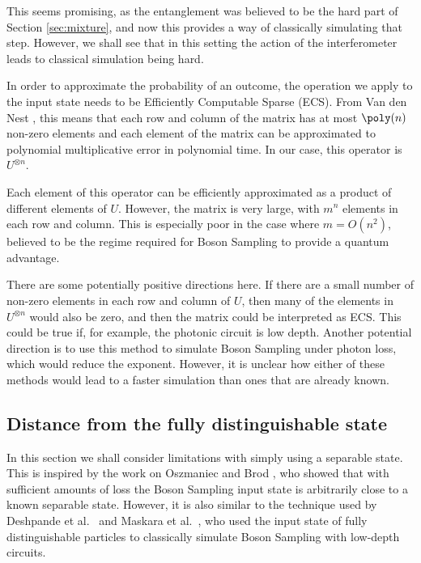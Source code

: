 This seems promising, as the entanglement was believed to be the hard part of Section \ref{sec:mixture}, and now this provides a way of classically simulating that step. However, we shall see that in this setting the action of the interferometer leads to classical simulation being hard.

In order to approximate the probability of an outcome, the operation we apply to the input state needs to be Efficiently Computable Sparse (ECS). From Van den Nest \cite{vandennest2011}, this means that each row and column of the matrix has at most $\poly(n)$ non-zero elements and each element of the matrix can be approximated to polynomial multiplicative error in polynomial time. In our case, this operator is $U^{\otimes n}$.

Each element of this operator can be efficiently approximated as a product of different elements of $U$. However, the matrix is very large, with $m^n$ elements in each row and column. This is especially poor in the case where $m = O(n^2)$, believed to be the regime required for Boson Sampling to provide a quantum advantage.

There are some potentially positive directions here. If there are a small number of non-zero elements in each row and column of $U$, then many of the elements in $U^{\otimes n}$ would also be zero, and then the matrix could be interpreted as ECS. This could be true if, for example, the photonic circuit is low depth. Another potential direction is to use this method to simulate Boson Sampling under photon loss, which would reduce the exponent. However, it is unclear how either of these methods would lead to a faster simulation than ones that are already known.

\subsection{Distance from the fully distinguishable state}
\label{ssec:fixed-dist-distance}

In this section we shall consider limitations with simply using a separable state. This is inspired by the work on Oszmaniec and Brod \cite{oszmaniec2018}, who showed that with sufficient amounts of loss the Boson Sampling input state is arbitrarily close to a known separable state. However, it is also similar to the technique used by Deshpande et al.~\cite{deshpande2018} and Maskara et al.~\cite{maskara2019}, who used the input state of fully distinguishable particles to classically simulate Boson Sampling with low-depth circuits.

